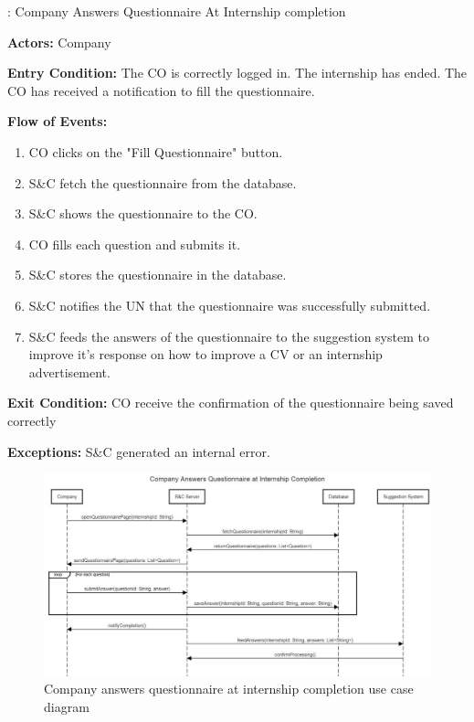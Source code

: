 \nextUseCaseID: Company Answers Questionnaire At Internship completion

\par \textbf{Actors:} Company

\par \textbf{Entry Condition:} The CO is correctly logged in. The internship has ended. The CO has received a notification to fill the questionnaire.

\par \textbf{Flow of Events:}

\begin{enumerate}
    \item CO clicks on the "Fill Questionnaire" button.
    \item S\&C fetch the questionnaire from the database.
    \item S\&C shows the questionnaire to the CO.
    \item CO fills each question and submits it.
    \item S\&C stores the questionnaire in the database.
    \item S\&C notifies the UN that the questionnaire was successfully submitted.
    \item S\&C feeds the answers of the questionnaire to the suggestion system to improve it's response on how to improve a CV or an internship advertisement.
\end{enumerate}

\par \textbf{Exit Condition:} CO receive the confirmation of the questionnaire being saved correctly

\par \textbf{Exceptions:}  S\&C generated an internal error.

\begin{figure}[H]
    \centering
    \includegraphics[width=1.0\textwidth]{Images/UC_14.pdf}
    \caption{Company answers questionnaire at internship completion use case diagram}
    \label{fig:use-case-diagram-14}
\end{figure}

